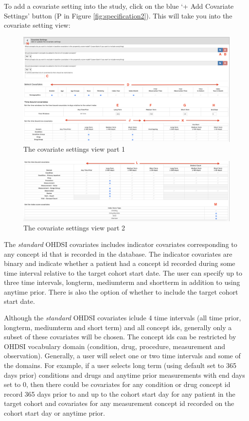 \documentclass[11pt]{book}
\begin{document}
To add a covariate setting into the study, click on the blue `+ Add
Covariate Settings' button (P in Figure \ref{fig:specification2}). This
will take you into the covariate setting view:

\begin{figure}
\includegraphics[width=1\linewidth]{images/PatientLevelPrediction/atlasImplementation/covariates_p1} \caption{The covariate settings view part 1}\label{fig:covariate1}
\end{figure}

\begin{figure}
\includegraphics[width=1\linewidth]{images/PatientLevelPrediction/atlasImplementation/covariates_p2} \caption{The covariate settings view part 2}\label{fig:covariate2}
\end{figure}

The \emph{standard} OHDSI covariates includes indicator covariates
corresponding to any concept id that is recorded in the database. The
indicator covariates are binary and indicate whether a patient had a
concept id recorded during some time interval relative to the target
cohort start date. The user can specify up to three time intervals,
longterm, mediumterm and shortterm in addition to using anytime prior.
There is also the option of whether to include the target cohort start
date.

Although the \emph{standard} OHDSI covariates iclude 4 time intervals
(all time prior, longterm, mediumterm and short term) and all concept
ids, generally only a subset of these covariates will be chosen. The
concept ids can be restricted by OHDSI vocabulary domain (condition,
drug, procedure, measurement and observation). Generally, a user will
select one or two time intervals and some of the domains. For example,
if a user selects long term (using default set to 365 days prior)
conditions and drugs and anytime prior measurements with end days set to
0, then there could be covariates for any condition or drug concept id
record 365 days prior to and up to the cohort start day for any patient
in the target cohort and covariates for any measurement concept id
recorded on the cohort start day or anytime prior.
\end{document}
